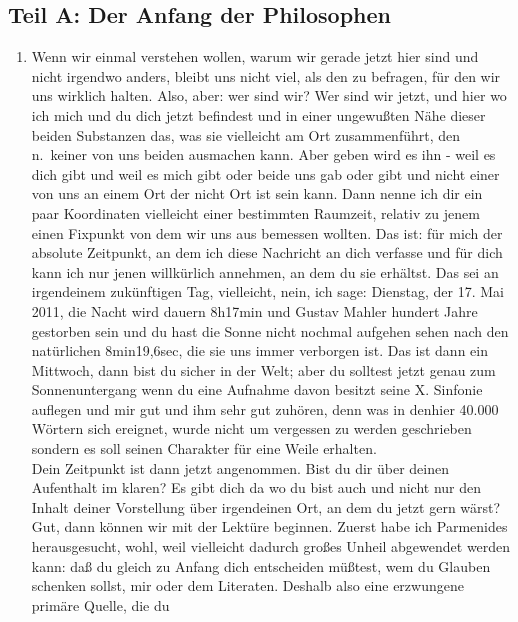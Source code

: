 \documentclass[
]{article}
\author{}
\date{\vspace{-2.5em}}
\providecommand{\tightlist}{%
  \setlength{\itemsep}{0pt}\setlength{\parskip}{0pt}}
\begin{document}
\subsection{Teil A: Der Anfang der
Philosophen}\label{teil-a-der-anfang-der-philosophen}

\begin{enumerate}
\def\labelenumi{\alph{enumi}.}
\tightlist
\item
  Wenn wir einmal verstehen wollen, warum wir gerade jetzt hier sind und
  nicht irgendwo anders, bleibt uns nicht viel, als den zu befragen, für
  den wir uns wirklich halten. Also, aber: wer sind wir? Wer sind wir
  jetzt, und hier wo ich mich und du dich jetzt befindest und in einer
  ungewußten Nähe dieser beiden Substanzen das, was sie vielleicht am
  Ort zusammenführt, den n.~keiner von uns beiden ausmachen kann. Aber
  geben wird es ihn - weil es dich gibt und weil es mich gibt oder beide
  uns gab oder gibt und nicht einer von uns an einem Ort der nicht Ort
  ist sein kann. Dann nenne ich dir ein paar Koordinaten vielleicht
  einer bestimmten Raumzeit, relativ zu jenem einen Fixpunkt von dem wir
  uns aus bemessen wollten. Das ist: für mich der absolute Zeitpunkt, an
  dem ich diese Nachricht an dich verfasse und für dich kann ich nur
  jenen willkürlich annehmen, an dem du sie erhältst. Das sei an
  irgendeinem zukünftigen Tag, vielleicht, nein, ich sage: Dienstag, der
  17. Mai 2011, die Nacht wird dauern 8h17min und Gustav Mahler hundert
  Jahre gestorben sein und du hast die Sonne nicht nochmal aufgehen
  sehen nach den natürlichen 8min19,6sec, die sie uns immer verborgen
  ist. Das ist dann ein Mittwoch, dann bist du sicher in der Welt; aber
  du solltest jetzt genau zum Sonnenuntergang wenn du eine Aufnahme
  davon besitzt seine X. Sinfonie auflegen und mir gut und ihm sehr gut
  zuhören, denn was in denhier 40.000 Wörtern sich ereignet, wurde nicht
  um vergessen zu werden geschrieben sondern es soll seinen Charakter
  für eine Weile erhalten.\\
  Dein Zeitpunkt ist dann jetzt angenommen. Bist du dir über deinen
  Aufenthalt im klaren? Es gibt dich da wo du bist auch und nicht nur
  den Inhalt deiner Vorstellung über irgendeinen Ort, an dem du jetzt
  gern wärst? Gut, dann können wir mit der Lektüre beginnen. Zuerst habe
  ich Parmenides herausgesucht, wohl, weil vielleicht dadurch großes
  Unheil abgewendet werden kann: daß du gleich zu Anfang dich
  entscheiden müßtest, wem du Glauben schenken sollst, mir oder dem
  Literaten. Deshalb also eine erzwungene primäre Quelle, die du

\end{enumerate}
\end{document}
